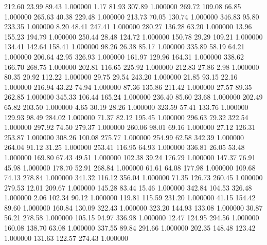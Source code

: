     212.60     23.99     89.43  1.000000
      1.17     81.93    307.89  1.000000
    269.72    109.08     66.85  1.000000
    265.63     40.38    229.48  1.000000
    213.73     70.05    130.74  1.000000
    346.83     95.80    233.35  1.000000
      8.20     48.41    247.41  1.000000
    280.27    136.28     63.20  1.000000
     13.96    155.23    194.79  1.000000
    250.44     28.48    124.72  1.000000
    150.78     29.29    109.21  1.000000
    134.41    142.64    158.41  1.000000
     98.26     26.38     85.17  1.000000
    335.89     58.19     64.21  1.000000
    206.64     42.95    326.93  1.000000
    161.97    129.96    164.31  1.000000
    338.62    166.70    268.75  1.000000
    202.81    116.65    225.92  1.000000
    212.83     27.86      2.98  1.000000
     80.35     20.92    112.22  1.000000
     29.75     29.54    243.20  1.000000
     21.85     93.15     22.16  1.000000
    216.94     43.22     74.94  1.000000
     87.36    135.86    211.42  1.000000
     27.57     89.35    262.85  1.000000
    345.33    106.44    165.24  1.000000
    236.40     85.60     23.68  1.000000
    202.49     65.82    203.50  1.000000
      4.65     30.19     28.26  1.000000
    323.59     57.41    133.76  1.000000
    129.93     98.49    284.02  1.000000
     71.37     82.12    195.45  1.000000
    296.63     79.32    322.54  1.000000
    297.92     74.50    279.37  1.000000
    260.06     98.01     69.16  1.000000
     27.12    126.31    253.87  1.000000
    308.26    100.08    275.77  1.000000
    254.99     62.58    342.39  1.000000
    264.04     91.12     31.25  1.000000
    253.41    116.95     64.93  1.000000
    336.81     26.05     53.48  1.000000
    169.80     67.43     49.51  1.000000
    102.38     39.24    176.79  1.000000
    147.37     76.91     45.98  1.000000
    178.70     52.91    268.84  1.000000
     61.61     64.08    177.98  1.000000
    109.68     74.13    278.84  1.000000
    341.32    116.12    356.04  1.000000
     71.35    126.73    260.45  1.000000
    279.53     12.01    209.67  1.000000
    145.28     83.44     15.46  1.000000
    342.84    104.53    326.48  1.000000
      2.06    102.34     90.12  1.000000
    119.81    115.59    231.20  1.000000
     41.15    154.42     89.60  1.000000
    160.84    130.09    322.43  1.000000
    323.20    144.93    133.08  1.000000
     30.87     56.21    278.58  1.000000
    105.15     94.97    336.98  1.000000
     12.47    124.95    294.56  1.000000
    160.08    138.70     63.08  1.000000
    337.55     89.84    291.66  1.000000
    202.35    148.48    123.42  1.000000
    131.63    122.57    274.43  1.000000
